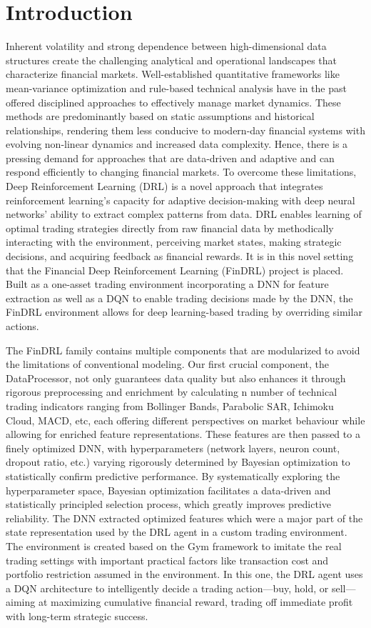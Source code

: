 \section{Introduction}
Inherent volatility and strong dependence between high-dimensional data structures create the challenging analytical and operational landscapes that characterize financial markets. Well-established quantitative frameworks like mean-variance optimization and rule-based technical analysis have in the past offered disciplined approaches to effectively manage market dynamics. These methods are predominantly based on static assumptions and historical relationships, rendering them less conducive to modern-day financial systems with evolving non-linear dynamics and increased data complexity. Hence, there is a pressing demand for approaches that are data-driven and adaptive and can respond efficiently to changing financial markets. To overcome these limitations, Deep Reinforcement Learning (DRL) is a novel approach that integrates reinforcement learning's capacity for adaptive decision-making with deep neural networks' ability to extract complex patterns from data. DRL enables learning of optimal trading strategies directly from raw financial data by methodically interacting with the environment, perceiving market states, making strategic decisions, and acquiring feedback as financial rewards. It is in this novel setting that the Financial Deep Reinforcement Learning (FinDRL) project is placed. Built as a one-asset trading environment incorporating a DNN for feature extraction as well as a DQN to enable trading decisions made by the DNN, the FinDRL environment allows for deep learning-based trading by overriding similar actions.

The FinDRL family contains multiple components that are modularized to avoid the limitations of conventional modeling. Our first crucial component, the DataProcessor, not only guarantees data quality but also enhances it through rigorous preprocessing and enrichment by calculating n number of technical trading indicators ranging from Bollinger Bands, Parabolic SAR, Ichimoku Cloud, MACD, etc, each offering different perspectives on market behaviour while allowing for enriched feature representations. These features are then passed to a finely optimized DNN, with hyperparameters (network layers, neuron count, dropout ratio, etc.) varying rigorously determined by Bayesian optimization to statistically confirm predictive performance. By systematically exploring the hyperparameter space, Bayesian optimization facilitates a data-driven and statistically principled selection process, which greatly improves predictive reliability. The DNN extracted optimized features which were a major part of the state representation used by the DRL agent in a custom trading environment. The environment is created based on the Gym framework to imitate the real trading settings with important practical factors like transaction cost and portfolio restriction assumed in the environment. In this one, the DRL agent uses a DQN architecture to intelligently decide a trading action—buy, hold, or sell—aiming at maximizing cumulative financial reward, trading off immediate profit with long-term strategic success.


